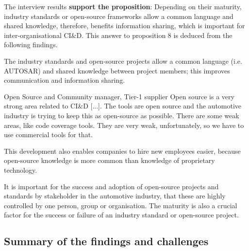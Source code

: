 

The interview results {\bf support the proposition}: Depending on their maturity, industry standards or open-source frameworks allow a common language and shared knowledge, therefore, benefits information sharing, which is important for inter-organisational CI\&D. 
This answer to proposition 8 is deduced from the following findings.

 The industry standards and open-source projects allow a common language (i.e. AUTOSAR) and shared knowledge between project members; this improves communication and information sharing.

\begin{aquote}{Open Source and Community manager, Tier-1 supplier}
Open source is a very strong area related to CI\&D [...]. The tools are open source and the automotive industry is trying to keep this as open-source as possible. There are some weak areas, like code coverage tools. They are very weak, unfortunately, so we have to use commercial tools for that.
\end{aquote}

This development also enables companies to hire new employees easier, because open-source knowledge is more common than knowledge of proprietary technology.




 It is important for the success and adoption of open-source projects and standards by stakeholder in the automotive industry, that these are highly controlled by one person, group or organisation. The maturity is also a crucial factor for the success or failure of an industry standard or open-source project.



\subsection{Summary of the findings and challenges}\label{sec:findings_RQs}

